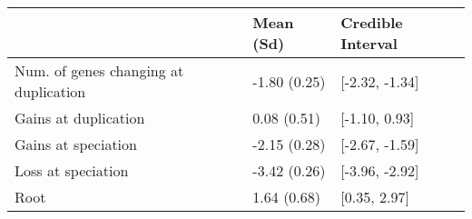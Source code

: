 
\begin{tabular}{lll}
\toprule
  & Mean (Sd) & Credible Interval\\
\midrule
Num. of genes changing at duplication & -1.80 (0.25) & {}[-2.32, -1.34]\\
Gains at duplication & 0.08 (0.51) & {}[-1.10, 0.93]\\
Gains at speciation & -2.15 (0.28) & {}[-2.67, -1.59]\\
Loss at speciation & -3.42 (0.26) & {}[-3.96, -2.92]\\
Root & 1.64 (0.68) & {}[0.35, 2.97]\\
\bottomrule
\end{tabular}
